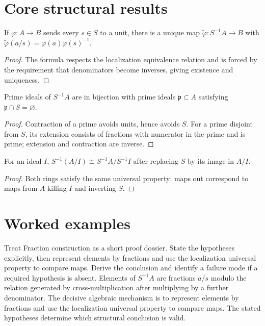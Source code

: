 \section{Core structural results}

\begin{theorem}\label{thm:v06-01}
If $\varphi:A\to B$ sends every $s\in S$ to a unit, there is a unique map $\widetilde\varphi:S^{-1}A\to B$ with $\widetilde\varphi(a/s)=\varphi(a)\varphi(s)^{-1}$.
\begin{proof}
The formula respects the localization equivalence relation and is forced by the requirement that denominators become inverses, giving existence and uniqueness.
\end{proof}
\end{theorem}

\begin{theorem}\label{thm:v06-02}
Prime ideals of $S^{-1}A$ are in bijection with prime ideals $\mathfrak p\subset A$ satisfying $\mathfrak p\cap S=\varnothing$.
\begin{proof}
Contraction of a prime avoids units, hence avoids $S$. For a prime disjoint from $S$, its extension consists of fractions with numerator in the prime and is prime; extension and contraction are inverse.
\end{proof}
\end{theorem}

\begin{theorem}\label{thm:v06-03}
For an ideal $I$, $S^{-1}(A/I)\cong S^{-1}A/S^{-1}I$ after replacing $S$ by its image in $A/I$.
\begin{proof}
Both rings satisfy the same universal property: maps out correspond to maps from $A$ killing $I$ and inverting $S$.
\end{proof}
\end{theorem}

\section{Worked examples}

\begin{example}\label{ex:v06-worked-01}
Treat Fraction construction as a short proof dossier. State the hypotheses explicitly, then represent elements by fractions and use the localization universal property to compare maps. Derive the conclusion and identify a failure mode if a required hypothesis is absent. Elements of $S^{-1}A$ are fractions $a/s$ modulo the relation generated by cross-multiplication after multiplying by a further denominator. The decisive algebraic mechanism is to represent elements by fractions and use the localization universal property to compare maps. The stated hypotheses determine which structural conclusion is valid.
\end{example}

